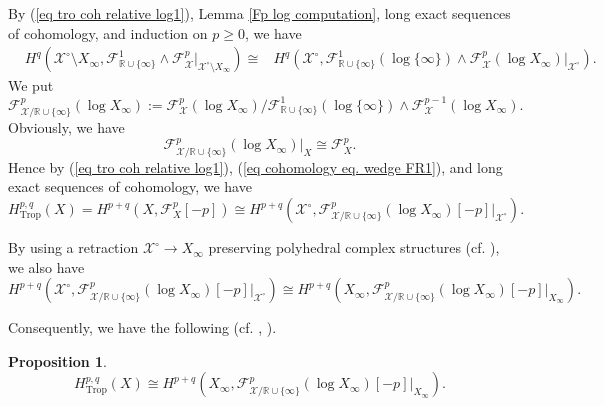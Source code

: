 \documentclass[12pt,a4]{amsart}
\newtheorem{prp}[thm]{Proposition}
\def\R{\mathbb{R}}
\def\F{\mathscr{F}}
\def\X{\mathscr{X}}
\def\Trop{\mathop{\mathrm{trop}}\nolimits}
\def\Trop{\mathop{\mathrm{Trop}}\nolimits}
\numberwithin{equation}{section}
\numberwithin{figure}{section}
\begin{document}
  By (\ref{eq tro coh relative log1}), 
  Lemma \ref{Fp log computation},
  long exact sequences of cohomology, 
  and induction on $p \geq 0$, 
  we have 
  \begin{align}\label{eq cohomology eq. wedge FR1}
    & H^{q} ( \X^{\circ} \setminus X_{\infty} ,
      \F^1_{\R \cup \{ \infty  \}} 
    \wedge \F^{p}_\X  |_{
      \X^{\circ} \setminus X_{\infty}
    } )  
   \cong  & H^{q} ( \X^{\circ}, 
     \F^1_{\R \cup \{ \infty  \}} (\log \{ \infty  \}) 
    \wedge \F^{p}_\X (\log X_{\infty})  |_{ \X^{\circ} }
     ).
  \end{align}
  We put 
   $$\F^p_{\X / \R \cup \{ \infty  \} } (\log X_{\infty} ) :=
    \F^p_\X (\log X_{\infty}) / 
    \F^1_{\R \cup \{ \infty  \}} (\log \{ \infty  \}) 
    \wedge \F^{p-1}_\X (\log X_{\infty}).$$
  Obviously, we have
  $$ \F^p_{\X / \R \cup \{ \infty  \} } (\log X_{\infty} ) |_{X} \cong \F^p_X.$$
  Hence  by (\ref{eq tro coh relative log1}),
   (\ref{eq cohomology eq. wedge FR1}), 
  and 
  long exact sequences of cohomology, 
  we have 
  $$ 
  H^{p,q}_{\Trop} (X) =
  H^{p+q} ( X, \F^p_X [ -p ]) 
   \cong H^{p+q} ( \X^{\circ} , 
    \F^p_{\X / \R \cup \{ \infty  \} } (\log X_{\infty} ) [ -p ] 
     |_{ \X^{\circ} }). $$

  By using a retraction
     $ \X^{\circ} \to X_{\infty}$ preserving polyhedral complex structures (cf. \cite[Section 3]{JellShawSmackaSuperformstropicalcohomologyandPoincarduality2019}), 
  we also have 
  $$
    H^{p+q} ( \X^{\circ} ,  \F^p_{\X / \R \cup \{ \infty  \} } (\log X_{\infty} )  [ -p ] 
     |_{ \X^{\circ} })
   \cong H^{p+q} ( X_{\infty} ,  
   \F^p_{\X / \R \cup \{ \infty  \} } (\log X_{\infty} ) [-p] |_{ X_{\infty}  })
   .$$

  Consequently, we have the following (cf. \cite[Corollary 2.16]{SteenbrinkLimitsofHodgestructures1976}, \cite[Theorem 11.16]{PetersSteenbrinkMixedHodgestructures2008}).
  \begin{prp}\label{ss reduction trop coh = log coh}
  $$  H^{p,q}_{\Trop} ( X) 
  \cong  H^{p+q} ( X_{\infty} ,  
   \F^p_{\X / \R \cup \{ \infty  \} } (\log X_{\infty} )[-p] |_{ X_{\infty}  }).$$
  \end{prp}
\end{document}
